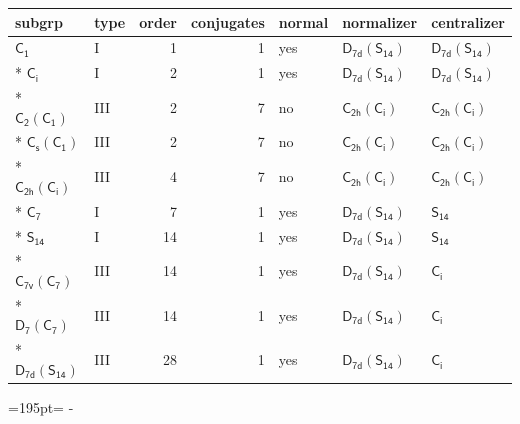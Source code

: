 \documentclass[10pt,a4paper]{article}
\newcommand{\needspace}[1]{\par\penalty-100\begingroup\dimen0=#1\relax\dimen2=\pagegoal
  \advance\dimen2-\pagetotal\ifdim\dimen0>\dimen2\relax\ifdim\dimen2>0pt\vfil\break\fi\fi
  \endgroup}
\numberwithin{equation}{section}
\newcommand{\grp}[1]{\mathsf{#1}}
\begin{document}
{\small\begin{longtable}{@{}llrrlll@{}}\toprule
subgrp & type & order & conjugates & normal & normalizer & centralizer\\\midrule\endhead
\bottomrule\endfoot\endlastfoot
\href{../../../rotation/data/pdf/C1.pdf}{$\grp{C_{1}}$} & I & 1 & 1 & yes & \href{D7d-S14.pdf}{$\grp{D_{7d}}(\grp{S_{14}})$} & \href{D7d-S14.pdf}{$\grp{D_{7d}}(\grp{S_{14}})$}\\*
\href{../../../rotation/data/pdf/S2.pdf}{$\grp{C_{i}}$} & I & 2 & 1 & yes & \href{D7d-S14.pdf}{$\grp{D_{7d}}(\grp{S_{14}})$} & \href{D7d-S14.pdf}{$\grp{D_{7d}}(\grp{S_{14}})$}\\*
\href{C2-C1.pdf}{$\grp{C_{2}}(\grp{C_{1}})$} & III & 2 & 7 & no & \href{C2h-S2.pdf}{$\grp{C_{2h}}(\grp{C_{i}})$} & \href{C2h-S2.pdf}{$\grp{C_{2h}}(\grp{C_{i}})$}\\*
\href{C1v-C1.pdf}{$\grp{C_{s}}(\grp{C_{1}})$} & III & 2 & 7 & no & \href{C2h-S2.pdf}{$\grp{C_{2h}}(\grp{C_{i}})$} & \href{C2h-S2.pdf}{$\grp{C_{2h}}(\grp{C_{i}})$}\\*
\href{C2h-S2.pdf}{$\grp{C_{2h}}(\grp{C_{i}})$} & III & 4 & 7 & no & \href{C2h-S2.pdf}{$\grp{C_{2h}}(\grp{C_{i}})$} & \href{C2h-S2.pdf}{$\grp{C_{2h}}(\grp{C_{i}})$}\\*
\href{../../../rotation/data/pdf/C7.pdf}{$\grp{C_{7}}$} & I & 7 & 1 & yes & \href{D7d-S14.pdf}{$\grp{D_{7d}}(\grp{S_{14}})$} & \href{../../../rotation/data/pdf/S14.pdf}{$\grp{S_{14}}$}\\*
\href{../../../rotation/data/pdf/S14.pdf}{$\grp{S_{14}}$} & I & 14 & 1 & yes & \href{D7d-S14.pdf}{$\grp{D_{7d}}(\grp{S_{14}})$} & \href{../../../rotation/data/pdf/S14.pdf}{$\grp{S_{14}}$}\\*
\href{C7v-C7.pdf}{$\grp{C_{7v}}(\grp{C_{7}})$} & III & 14 & 1 & yes & \href{D7d-S14.pdf}{$\grp{D_{7d}}(\grp{S_{14}})$} & \href{../../../rotation/data/pdf/S2.pdf}{$\grp{C_{i}}$}\\*
\href{D7-C7.pdf}{$\grp{D_{7}}(\grp{C_{7}})$} & III & 14 & 1 & yes & \href{D7d-S14.pdf}{$\grp{D_{7d}}(\grp{S_{14}})$} & \href{../../../rotation/data/pdf/S2.pdf}{$\grp{C_{i}}$}\\*
\href{D7d-S14.pdf}{$\grp{D_{7d}}(\grp{S_{14}})$} & III & 28 & 1 & yes & \href{D7d-S14.pdf}{$\grp{D_{7d}}(\grp{S_{14}})$} & \href{../../../rotation/data/pdf/S2.pdf}{$\grp{C_{i}}$}\\
\bottomrule\end{longtable}}
\needspace{195pt}
\end{document}
